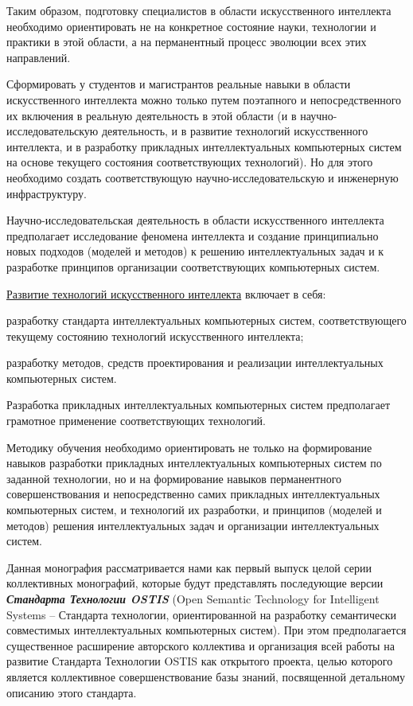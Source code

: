 \begin{SCn}
{	Таким образом, подготовку специалистов в области искусственного интеллекта необходимо ориентировать не на конкретное состояние науки, технологии и практики в этой области, а на перманентный процесс эволюции всех этих направлений.
	
	Сформировать у студентов и магистрантов реальные навыки в области искусственного интеллекта можно только путем поэтапного и непосредственного их включения в  реальную деятельность в этой области (и в научно-исследовательскую деятельность, и в развитие технологий искусственного интеллекта, и в разработку прикладных интеллектуальных компьютерных систем на основе текущего состояния соответствующих технологий). Но для этого необходимо создать соответствующую научно-исследовательскую и инженерную инфраструктуру.
	
	Научно-исследовательская деятельность  в области искусственного интеллекта предполагает исследование феномена интеллекта и создание принципиально новых подходов (моделей и методов) к решению интеллектуальных задач и к разработке принципов организации соответствующих компьютерных систем.
	
	\uline{Развитие технологий искусственного интеллекта} включает в себя:
	\begin{scnitemize}
		\item разработку стандарта интеллектуальных компьютерных систем, соответствующего текущему состоянию технологий искусственного интеллекта;
		\item разработку методов, средств проектирования и реализации интеллектуальных компьютерных систем.
	\end{scnitemize}
	
	Разработка прикладных интеллектуальных компьютерных систем  предполагает грамотное применение соответствующих технологий.
	
	
	Методику обучения необходимо ориентировать не только на формирование навыков разработки прикладных интеллектуальных компьютерных систем по заданной технологии, но и на формирование навыков перманентного совершенствования  и непосредственно самих прикладных интеллектуальных компьютерных систем, и технологий их разработки, и принципов (моделей и методов) решения интеллектуальных задач и организации интеллектуальных систем.


Данная монография рассматривается нами как первый выпуск целой серии коллективных монографий, которые будут представлять последующие версии \textbf{\textit{Стандарта Технологии OSTIS}} (Open Semantic Technology for Intelligent Systems -- Стандарта технологии, ориентированной на разработку семантически совместимых интеллектуальных компьютерных систем). При этом предполагается существенное расширение авторского коллектива и организация всей работы на развитие Стандарта Технологии OSTIS как открытого проекта, целью которого является коллективное совершенствование базы знаний, посвященной детальному описанию этого стандарта.

}
\end{SCn}
